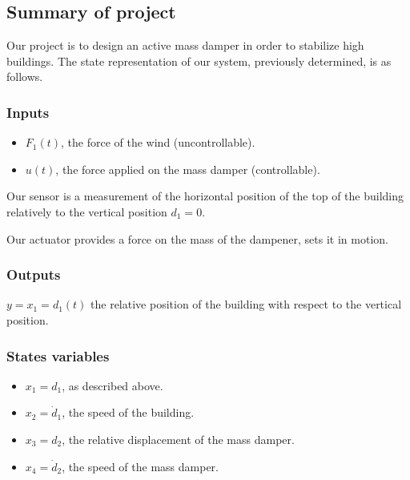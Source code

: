 \subsection{Summary of project}
Our project is to design an active mass damper in order to stabilize high buildings. The state representation of our system, previously determined, is as follows.

\subsubsection{Inputs}
\begin{itemize}
    \item $F_1(t)$, the force of the wind (uncontrollable).
    \item $u(t)$, the force applied on the mass damper (controllable).
\end{itemize}
Our sensor is a measurement of the horizontal position of the top of the building relatively to the vertical position $d_1 = 0$.\par
Our actuator provides a force on the mass of the dampener, sets it in motion.

\subsubsection{Outputs}
$y = x_1 = d_1(t)$ the relative position of the building with respect to the vertical position.

\subsubsection{States variables}
\begin{itemize}
    \item $x_1 = d_1$, as described above.
    \item $x_2 = \dot d_1$, the speed of the building.
    \item $x_3 = d_2$, the relative displacement of the mass damper.
    \item $x_4 = \dot d_2$, the speed of the mass damper.
\end{itemize}

